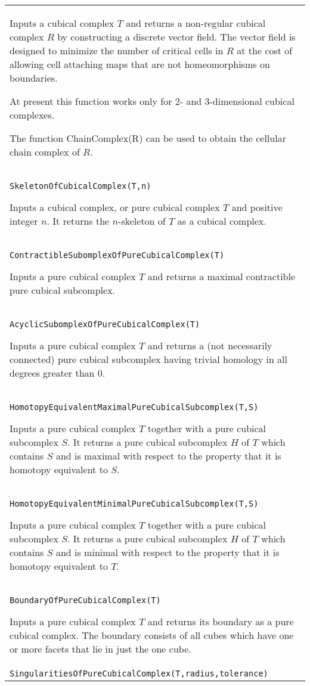 \documentclass[a4paper,11pt]{report}
\begin{document}
{\begin{center}
\begin{tabular}{|l|}
 Inputs a cubical complex $T$ and returns a non-regular cubical complex $R$ by constructing a discrete vector field. The vector field is designed to
minimize the number of critical cells in $R$ at the cost of allowing cell attaching maps that are not homeomorphisms on
boundaries. 

 At present this function works only for 2- and 3-dimensional cubical
complexes. 

 The function ChainComplex(R) can be used to obtain the cellular chain complex
of $R$. \\
 \index{SkeletonOfCubicalComplex} \texttt{SkeletonOfCubicalComplex(T,n)} 

 Inputs a cubical complex, or pure cubical complex $T$ and positive integer $n$. It returns the $n$-skeleton of $T$ as a cubical complex. \\
 \index{ContractibleSubomplexOfPureCubicalComplex} \texttt{ContractibleSubomplexOfPureCubicalComplex(T)} 

 Inputs a pure cubical complex $T$ and returns a maximal contractible pure cubical subcomplex. \\
 \index{AcyclicSubomplexOfPureCubicalComplex} \texttt{AcyclicSubomplexOfPureCubicalComplex(T)} 

 Inputs a pure cubical complex $T$ and returns a (not necessarily connected) pure cubical subcomplex having
trivial homology in all degrees greater than $0$. \\
 \index{HomotopyEquivalentMaximalPureCubicalSubcomplex} \texttt{HomotopyEquivalentMaximalPureCubicalSubcomplex(T,S)} 

 Inputs a pure cubical complex $T$ together with a pure cubical subcomplex $S$. It returns a pure cubical subcomplex $H$ of $T$ which contains $S$ and is maximal with respect to the property that it is homotopy equivalent to $S$. \\
 \index{HomotopyEquivalentMinimalPureCubicalSubcomplex} \texttt{HomotopyEquivalentMinimalPureCubicalSubcomplex(T,S)} 

 Inputs a pure cubical complex $T$ together with a pure cubical subcomplex $S$. It returns a pure cubical subcomplex $H$ of $T$ which contains $S$ and is minimal with respect to the property that it is homotopy equivalent to $T$. \\
 \index{BoundaryOfPureCubicalComplex} \texttt{BoundaryOfPureCubicalComplex(T)} 

 Inputs a pure cubical complex $T$ and returns its boundary as a pure cubical complex. The boundary consists of
all cubes which have one or more facets that lie in just the one cube. \\
 \index{SingularitiesOfPureCubicalComplex} \texttt{SingularitiesOfPureCubicalComplex(T,radius,tolerance)} 


\end{tabular}
\end{center}}
\end{document}
